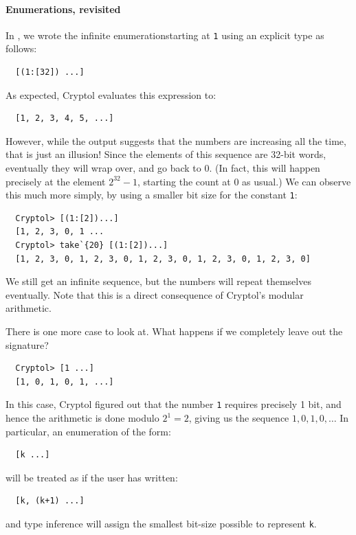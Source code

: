 \paragraph*{Enumerations, revisited} In
, we wrote the infinite
enumeration{\indEnum\indInfSeq}starting at {\tt 1} using an explicit
type as follows:
\begin{Verbatim}
  [(1:[32]) ...]
\end{Verbatim}
As expected, Cryptol evaluates this expression to:
\begin{Verbatim}
  [1, 2, 3, 4, 5, ...]
\end{Verbatim}
However, while the output suggests that the numbers are increasing all
the time, that is just an illusion! Since the elements of this
sequence are 32-bit words, eventually they will wrap over, and go back
to 0. (In fact, this will happen precisely at the element $2^{32}-1$,
starting the count at $0$ as usual.) We can observe this much more
simply, by using a smaller bit size for the constant {\tt 1}:
\begin{Verbatim}
  Cryptol> [(1:[2])...]
  [1, 2, 3, 0, 1 ...
  Cryptol> take`{20} [(1:[2])...]
  [1, 2, 3, 0, 1, 2, 3, 0, 1, 2, 3, 0, 1, 2, 3, 0, 1, 2, 3, 0]
\end{Verbatim}
We still get an infinite sequence, but the numbers will repeat
themselves eventually. Note that this is a direct consequence of
Cryptol's modular arithmetic.\indModular


There is one more case to look at. What happens if we completely leave
out the signature?
\begin{Verbatim}
  Cryptol> [1 ...]
  [1, 0, 1, 0, 1, ...]
\end{Verbatim}
In this case, Cryptol figured out that the number {\tt 1} requires
precisely 1 bit, and hence the arithmetic is done modulo $2^1 = 2$,
giving us the sequence $1,0,1,0,\ldots$ In particular, an
enumeration of the form:
\begin{Verbatim}
  [k ...]
\end{Verbatim}
will be treated as if the user has written:
\begin{Verbatim}
  [k, (k+1) ...]
\end{Verbatim}
and type inference will assign the smallest bit-size possible to
represent {\tt k}.  

